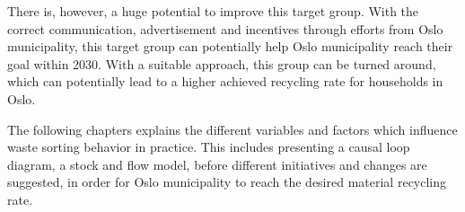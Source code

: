 \indent \newline
There is, however, a huge potential to improve this target group. With the correct communication, advertisement and incentives through efforts from Oslo municipality, this target group can potentially help Oslo municipality reach their goal within 2030. With a suitable approach, this group can be turned around, which can potentially lead to a higher achieved recycling rate for households in Oslo. 

\indent \newline
The following chapters explains the different variables and factors which influence waste sorting behavior in practice. This includes presenting a causal loop diagram, a stock and flow model, before different initiatives and changes are suggested, in order for Oslo municipality to reach the desired material recycling rate. 

